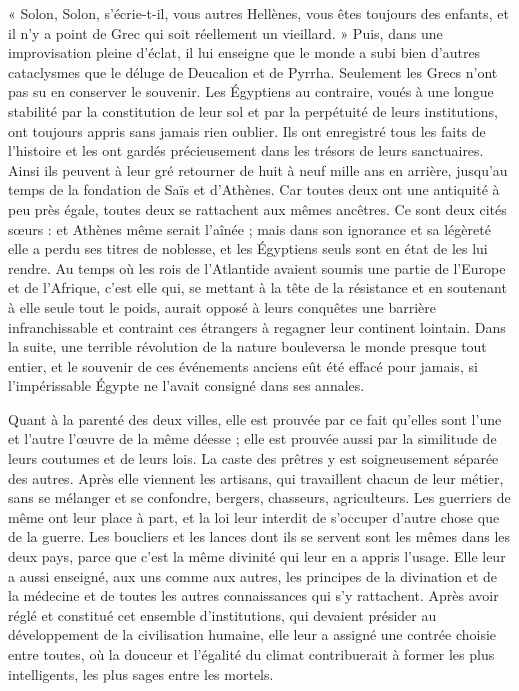 \documentclass[a4paper, 11pt, oneside]{article}
\begin{document}
« Solon, Solon, s'écrie-t-il, vous autres Hellènes, vous êtes toujours des enfants, et il n'y a point de Grec qui soit réellement un vieillard. » Puis, dans une improvisation pleine d'éclat, il lui enseigne que le monde a subi bien d'autres cataclysmes que le déluge de Deucalion et de Pyrrha. Seulement les Grecs n'ont pas su en conserver le souvenir. Les Égyptiens au contraire, voués à une longue stabilité par la constitution de leur sol et par la perpétuité de leurs institutions, ont toujours appris sans jamais rien oublier. Ils ont enregistré tous les faits de l'histoire et les ont gardés précieusement dans les trésors de leurs sanctuaires. Ainsi ils peuvent à leur gré retourner de huit à neuf mille ans en arrière, jusqu'au temps de la fondation de Saïs et d'Athènes. Car toutes deux ont une antiquité à peu près égale, toutes deux se rattachent aux mêmes ancêtres. Ce sont deux cités sœurs : et Athènes même serait l'aînée ; mais dans son ignorance et sa légèreté elle a perdu ses titres de noblesse, et les Égyptiens seuls sont en état de les lui rendre. Au temps où les rois de l'Atlantide avaient soumis une partie de l'Europe et de l'Afrique, c'est elle qui, se mettant à la tête de la résistance et en soutenant à elle seule tout le poids, aurait opposé à leurs conquêtes une barrière infranchissable et contraint ces étrangers à regagner leur continent lointain. Dans la suite, une terrible révolution de la nature bouleversa le monde presque tout entier, et le souvenir de ces événements anciens eût été effacé pour jamais, si l'impérissable Égypte ne l'avait consigné dans ses annales.

Quant à la parenté des deux villes, elle est prouvée par ce fait qu'elles sont l'une et l'autre l'œuvre de la même déesse ; elle est prouvée aussi par la similitude de leurs coutumes et de leurs lois. La caste des prêtres y est soigneusement séparée des autres. Après elle viennent les artisans, qui travaillent chacun de leur métier, sans se mélanger et se confondre, bergers, chasseurs, agriculteurs. Les guerriers de même ont leur place à part, et la loi leur interdit de s'occuper d'autre chose que de la guerre. Les boucliers et les lances dont ils se servent sont les mêmes dans les deux pays, parce que c'est la même divinité qui leur en a appris l'usage. Elle leur a aussi enseigné, aux uns comme aux autres, les principes de la divination et de la médecine et de toutes les autres connaissances qui s'y rattachent. Après avoir réglé et constitué cet ensemble d'institutions, qui devaient présider au développement de la civilisation humaine, elle leur a assigné une contrée choisie entre toutes, où la douceur et l'égalité du climat contribuerait à former les plus intelligents, les plus sages entre les mortels.
\end{document}
